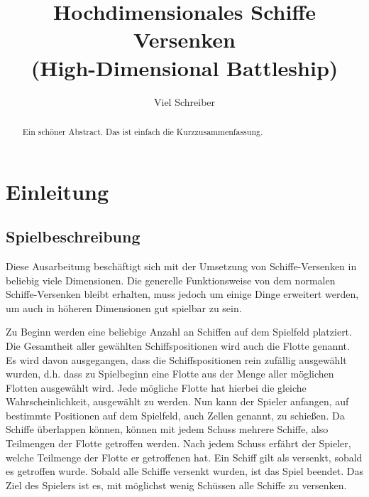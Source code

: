 \documentclass[a4paper,12pt]{llncs}
\numberwithin{equation}{section}
\begin{document}

\author{Viel Schreiber}

\title{Hochdimensionales Schiffe Versenken \\
(High-Dimensional Battleship)}

\maketitle

\thispagestyle{empty}

\begin{abstract}
Ein schöner Abstract. Das ist einfach die Kurzzusammenfassung.
\end{abstract}

\section{Einleitung}

\subsection{Spielbeschreibung}
Diese Ausarbeitung beschäftigt sich mit der Umsetzung von Schiffe-Versenken in beliebig viele Dimensionen.
Die generelle Funktionsweise von dem normalen Schiffe-Versenken bleibt erhalten, muss jedoch um einige Dinge erweitert werden, um auch in höheren Dimensionen gut spielbar zu sein.

Zu Beginn werden eine beliebige Anzahl an Schiffen auf dem Spielfeld platziert.
Die Gesamtheit aller gewählten Schiffspositionen wird auch die Flotte genannt.
Es wird davon ausgegangen, dass die Schiffspositionen rein zufällig ausgewählt wurden, d.h. dass zu Spielbeginn eine Flotte aus der Menge aller möglichen Flotten ausgewählt wird. Jede mögliche Flotte hat hierbei die gleiche Wahrscheinlichkeit, ausgewählt zu werden.
Nun kann der Spieler anfangen, auf bestimmte Positionen auf dem Spielfeld, auch Zellen genannt, zu schießen.
Da Schiffe überlappen können, können mit jedem Schuss mehrere Schiffe, also Teilmengen der Flotte getroffen werden.
Nach jedem Schuss erfährt der Spieler, welche Teilmenge der Flotte er getroffenen hat.
Ein Schiff gilt als versenkt, sobald es getroffen wurde.
Sobald alle Schiffe versenkt wurden, ist das Spiel beendet.
Das Ziel des Spielers ist es, mit möglichst wenig Schüssen alle Schiffe zu versenken.
\end{document}
